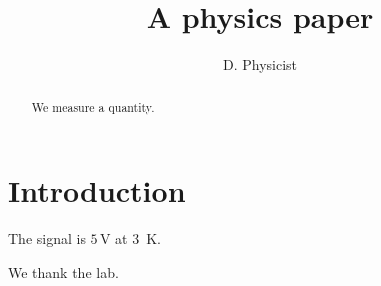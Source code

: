 \documentclass[aps,prx,twocolumn]{revtex4-2}
\begin{document}
\title{A physics paper}
\author{D. Physicist}
\begin{abstract}
We measure a quantity.
\end{abstract}
\maketitle
\section{Introduction}
The signal is $5\,\mathrm{V}$ at \SI{3}{\kelvin}.
\begin{acknowledgments}
We thank the lab.
\end{acknowledgments}
\end{document}
